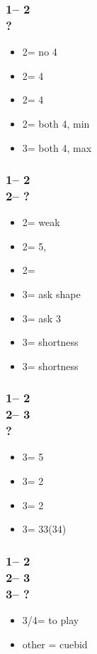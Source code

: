 \subsubsection*{1\nt -- 2\clubs\\
                ?}
\begin{itemize}
    \item 2\diams = no 4\major
    \item 2\hearts = 4\hearts
    \item 2\spades = 4\spades
    \item 2\nt = both 4\major, min
    \item 3\clubs = both 4\major, max
\end{itemize}

\subsubsection*{1\nt -- 2\clubs\\
                2\diams -- ?}
\begin{itemize}
    \item 2\hearts = \major weak
    \item 2\spades = 5\spades, \inv
    \item 2\nt = \inv
    \item 3\clubs = ask shape
    \item 3\diams = ask 3\major
    \item 3\hearts = \clubs shortness
    \item 3\spades = \diams shortness
\end{itemize}

\subsubsection*{1\nt -- 2\clubs\\
                2\diams -- 3\clubs\\
                ?}
\begin{itemize}
    \item 3\diams = 5\minor \qq
    \item 3\hearts = 2\spades
    \item 3\spades = 2\hearts
    \item 3\nt = 33(34)
\end{itemize}

\subsubsection*{1\nt -- 2\clubs\\
                2\diams -- 3\diams\\
                3\major -- ?}
\begin{itemize}
    \item 3\nt/4\major = to play
    \item other = cuebid
\end{itemize}

